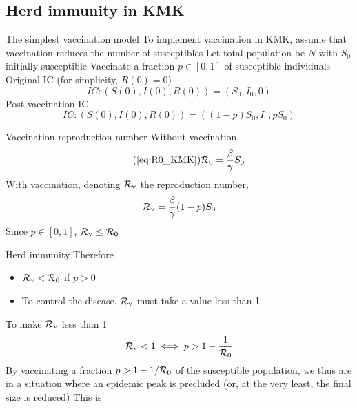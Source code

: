 \documentclass[aspectratio=169]{beamer}\usepackage[]{graphicx}\usepackage[]{xcolor}
\begin{document}
\subsection{Herd immunity in KMK}


\begin{frame}{The simplest vaccination model}
To implement vaccination in KMK, assume that vaccination reduces the number of susceptibles
\vfill
Let total population be $N$ with $S_0$ initially susceptible
\vfill
Vaccinate a fraction $p\in[0,1]$ of susceptible individuals
\vfill
Original IC (for simplicity, $R(0)=0$)
\begin{equation}\label{eq:IC_KMK_novacc}
IC: (S(0),I(0),R(0)) = (S_0,I_0,0)
\end{equation}
Post-vaccination IC 
\begin{equation}\label{eq:IC_KMK_vacc}
IC: (S(0),I(0),R(0)) = ((1-p)S_0,I_0,pS_0)
\end{equation}
\end{frame}


\begin{frame}{Vaccination reproduction number}
  Without vaccination
  \begin{equation}\tag{\ref{eq:R0_KMK}}
    \R_0=\frac{\beta}{\gamma}S_0
  \end{equation}
  \vfill
  With vaccination, denoting $\mathcal{R}_{\text{v}}$ the reproduction number,
  \begin{equation}
    \mathcal{R}_{\text{v}} = \frac{\beta}{\gamma}(1-p)S_0
  \end{equation}
  \vfill
  Since $p\in[0,1]$, $\mathcal{R}_{\text{v}}\leq\mathcal{R}_0$
\end{frame}


\begin{frame}{Herd immunity}
  Therefore
  \begin{itemize}
    \item $\mathcal{R}_{\text{v}}<\mathcal{R}_0$ if $p>0$ 
    \item To control the disease, $\mathcal{R}_{\text{v}}$ must take a value less than 1
  \end{itemize}
  \vfill
To make $\mathcal{R}_{\text{v}}$ less than 1
  \begin{equation}\label{eq:herd_immunity}
    \mathcal{R}_{\text{v}}<1 \iff p> 1-\frac{1}{\mathcal{R}_0}
  \end{equation}
  \vfill
  By vaccinating a fraction $p>1-1/\mathcal{R}_0$ of the susceptible population, we thus are in a situation where an epidemic peak is precluded (or, at the very least, the final size is reduced)
  \vfill
  This is 
\end{frame}
\end{document}
